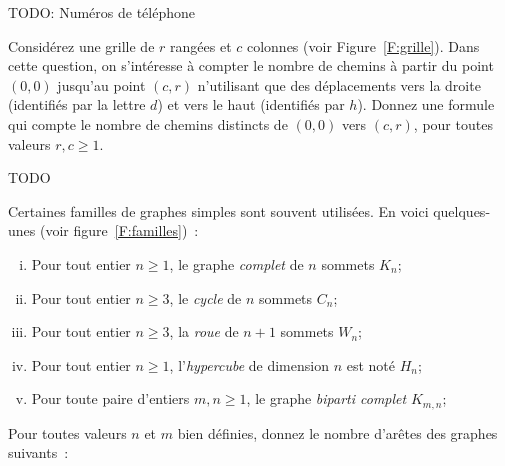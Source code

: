 \documentclass[12pt,addpoints]{exam}
\begin{document}
\begin{questions}
\question
TODO: Numéros de téléphone

\question
Considérez une grille de $r$ rangées et $c$ colonnes (voir Figure~\ref{F:grille}). Dans cette question, on s'intéresse à compter le nombre de chemins à partir du point $(0,0)$ jusqu'au point $(c,r)$ n'utilisant que des déplacements vers la droite (identifiés par la lettre $d$) et vers le haut (identifiés par $h$). Donnez une formule qui compte le nombre de chemins distincts de $(0,0)$ vers $(c,r)$, pour toutes valeurs $r,c \geq 1$.

% 
\question
TODO


\question
Certaines familles de graphes simples sont souvent utilisées. En voici quelques-unes (voir figure~\ref{F:familles})~:
\begin{enumerate}[(i)]
  \item Pour tout entier $n \geq 1$, le graphe \emph{complet} de $n$ sommets $K_n$;
  \item Pour tout entier $n \geq 3$, le \emph{cycle} de $n$ sommets $C_n$;
  \item Pour tout entier $n \geq 3$, la \emph{roue} de $n + 1$ sommets $W_n$;
  \item Pour tout entier $n \geq 1$, l'\emph{hypercube} de dimension $n$ est noté $H_n$;
  \item Pour toute paire d'entiers $m,n \geq 1$, le graphe \emph{biparti complet} $K_{m,n}$;
\end{enumerate}
Pour toutes valeurs $n$ et $m$ bien définies, donnez le nombre d'arêtes des graphes suivants~:
\end{questions}
\end{document}
